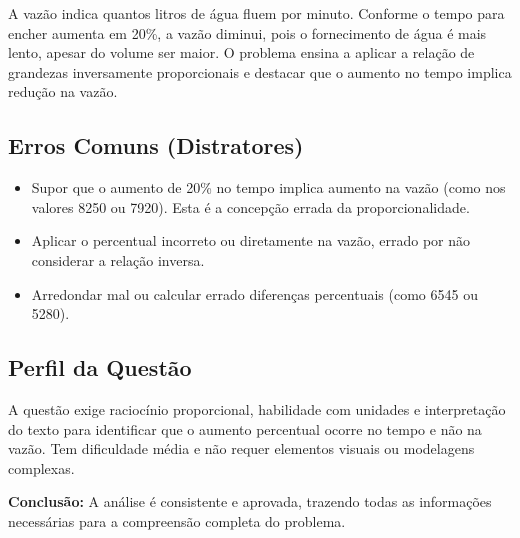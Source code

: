 \documentclass{article}
\begin{document}
A vazão indica quantos litros de água fluem por minuto. Conforme o tempo para encher aumenta em 20\%, a vazão diminui, pois o fornecimento de água é mais lento, apesar do volume ser maior. O problema ensina a aplicar a relação de grandezas inversamente proporcionais e destacar que o aumento no tempo implica redução na vazão.

\subsection*{Erros Comuns (Distratores)}

\begin{itemize}
  \item Supor que o aumento de 20\% no tempo implica aumento na vazão (como nos valores 8250 ou 7920). Esta é a concepção errada da proporcionalidade.
  \item Aplicar o percentual incorreto ou diretamente na vazão, errado por não considerar a relação inversa.
  \item Arredondar mal ou calcular errado diferenças percentuais (como 6545 ou 5280).
\end{itemize}

\subsection*{Perfil da Questão}

A questão exige raciocínio proporcional, habilidade com unidades e interpretação do texto para identificar que o aumento percentual ocorre no tempo e não na vazão. Tem dificuldade média e não requer elementos visuais ou modelagens complexas.

\bigskip

\textbf{Conclusão:} A análise é consistente e aprovada, trazendo todas as informações necessárias para a compreensão completa do problema.
\end{document}

